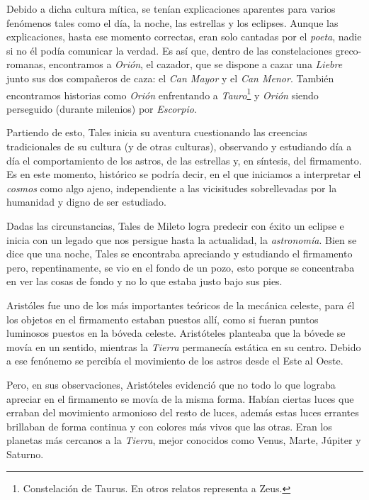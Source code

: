 \documentclass[12pt,a4paper]{article}
\begin{document}
\medskip 

Debido a dicha cultura m\'itica, se ten\'ian explicaciones aparentes para varios fen\'omenos tales como el d\'ia, la noche, las estrellas y los eclipses. Aunque las explicaciones, hasta ese momento correctas, eran solo cantadas por el \textit{poeta}, nadie si no \'el pod\'ia comunicar la verdad. Es as\'i que, dentro de las constelaciones greco-romanas, encontramos a \textit{Ori\'on}, el cazador, que se dispone a cazar una \textit{Liebre} junto sus dos compa\~neros de caza: el \textit{Can Mayor} y el \textit{Can Menor}. Tambi\'en encontramos historias como \textit{Ori\'on} enfrentando a \textit{Tauro}\footnote{Constelaci\'on de Taurus. En otros relatos representa a Zeus.} y \textit{Ori\'on} siendo perseguido (durante milenios) por \textit{Escorpio}.

\medskip 

Partiendo de esto, Tales inicia su aventura cuestionando las creencias tradicionales de su cultura (y de otras culturas), observando y estudiando d\'ia a d\'ia el comportamiento de los astros, de las estrellas y, en s\'intesis, del firmamento. Es en este momento, hist\'orico se podr\'ia decir, en el que iniciamos a interpretar el \textit{cosmos} como algo ajeno, independiente a las vicisitudes sobrellevadas por la humanidad y digno de ser estudiado.

\medskip 

Dadas las circunstancias, Tales de Mileto logra predecir con \'exito un eclipse e inicia con un legado que nos persigue hasta la actualidad, la \textit{astronom\'ia}. Bien se dice que una noche, Tales se encontraba apreciando y estudiando el firmamento pero, repentinamente, se vio en el fondo de un pozo, esto porque se concentraba en ver las cosas de fondo y no lo que estaba justo bajo sus pies.

\medskip 

Arist\'oles fue uno de los m\'as importantes te\'oricos de la mec\'anica celeste, para \'el los objetos en el firmamento estaban puestos all\'i, como si fueran puntos luminosos puestos en la b\'oveda celeste. Arist\'oteles planteaba que la b\'ovede se mov\'ia en un sentido, mientras la \textit{Tierra} permanec\'ia est\'atica en su centro. Debido a ese fen\'onemo se percib\'ia el movimiento de los astros desde el Este al Oeste.

\medskip 

Pero, en sus observaciones, Arist\'oteles evidenci\'o que no todo lo que lograba apreciar en el firmamento se mov\'ia de la misma forma. Hab\'ian ciertas luces que erraban del movimiento armonioso del resto de luces, adem\'as estas luces errantes brillaban de forma continua y con colores m\'as vivos que las otras. Eran los planetas m\'as cercanos a la \textit{Tierra}, mejor conocidos como Venus, Marte, J\'upiter y Saturno.
\end{document}

